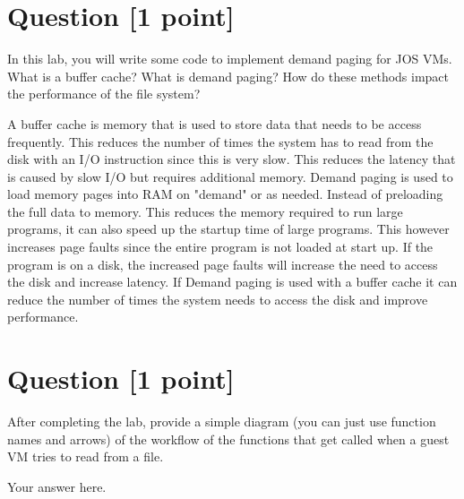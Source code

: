 \documentclass[11pt]{article}
\begin{document}
\section{Question [1 point]}

In this lab, you will write some code to implement demand paging for JOS VMs. What is a buffer cache? What is demand paging? How do these methods impact the performance of the file system?

\begin{solution}
A buffer cache is memory that is used to store data that needs to be access frequently.
This reduces the number of times the system has to read from the disk with an I/O instruction since this is very slow.
This reduces the latency that is caused by slow I/O but requires additional memory.
Demand paging is used to load memory pages into RAM on "demand" or as needed. Instead of preloading the full data to memory.
This reduces the memory required to run large programs, it can also speed up the startup time of large programs.
This however increases page faults since the entire program is not loaded at start up. If the program is on a disk, the increased page faults will increase the need to access the disk and increase latency. 
If Demand paging is used with a buffer cache it can reduce the number of times the system needs to access the disk and improve performance.
\end{solution}


\section{Question [1 point]}

After completing the lab, provide a simple diagram (you can just use function names and arrows) of the workflow of the functions that get called when a guest VM tries to read from a file.

\begin{solution}
Your answer here.
\end{solution}
\end{document}

